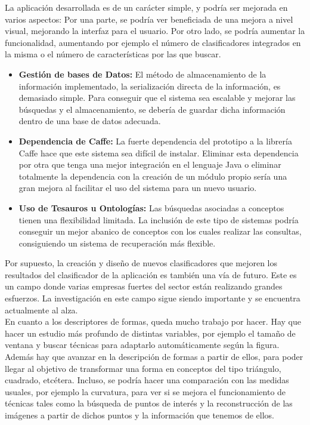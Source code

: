 La aplicación desarrollada es de un carácter simple, y podría ser mejorada en varios aspectos: Por una parte, se podría ver beneficiada de una mejora a nivel visual, mejorando la interfaz para el usuario. Por otro lado, se podría aumentar la funcionalidad, aumentando por ejemplo el número de clasificadores integrados en la misma o el número de características por las que buscar.\\
\begin{itemize}
\item \textbf{Gestión de bases de Datos:} El método de almacenamiento de la información implementado, la serialización directa de la información, es demasiado simple. Para conseguir que el sistema sea escalable y mejorar las búsquedas y el almacenamiento, se debería de guardar dicha información dentro de una base de datos adecuada.
\item \textbf{Dependencia de Caffe:} La fuerte dependencia del prototipo a la librería Caffe hace que este sistema sea difícil de instalar. Eliminar esta dependencia por otra que tenga una mejor integración en el lenguaje Java o eliminar totalmente la dependencia con la creación de un módulo propio sería una gran mejora al facilitar el uso del sistema para un nuevo usuario.
\item \textbf{Uso de Tesauros u Ontologías:} Las búsquedas asociadas a conceptos tienen una flexibilidad limitada. La inclusión de este tipo de sistemas podría conseguir un mejor abanico de conceptos con los cuales realizar las consultas, consiguiendo un sistema de recuperación más flexible.
\end{itemize}

Por supuesto, la creación y diseño de nuevos clasificadores que mejoren los resultados del clasificador de la aplicación es también una vía de futuro. Este es un campo donde varias empresas fuertes del sector están realizando grandes esfuerzos. La investigación en este campo sigue siendo importante y se encuentra actualmente al alza. \\

En cuanto a los descriptores de formas, queda mucho trabajo por hacer. Hay que hacer un estudio más profundo de distintas variables, por ejemplo el tamaño de ventana y buscar técnicas para adaptarlo automáticamente según la figura. Además hay que avanzar en la descripción de formas a partir de ellos, para poder llegar al objetivo de transformar una forma en conceptos del tipo triángulo, cuadrado, etcétera. Incluso, se podría hacer una comparación con las medidas usuales, por ejemplo la curvatura, para ver si se mejora el funcionamiento de técnicas tales como la búsqueda de puntos de interés y la reconstrucción de las imágenes a partir de dichos puntos y la información que tenemos de ellos.\\
